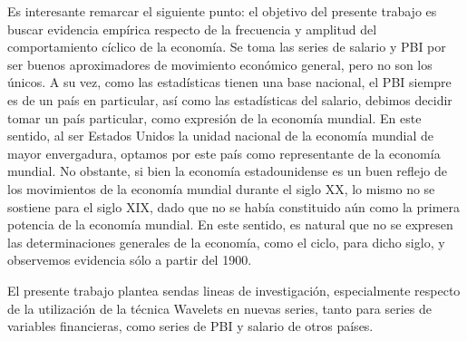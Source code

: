\documentclass[a4paper]{article}
\begin{document}
Es interesante remarcar el siguiente punto: el objetivo del presente trabajo es buscar evidencia empírica respecto de la frecuencia y amplitud del comportamiento cíclico de la economía. Se toma las series de salario y PBI por ser buenos aproximadores de movimiento económico general, pero no son los únicos. A su vez, como las estadísticas tienen una base nacional, el PBI siempre es de un país en particular, así como las estadísticas del salario, debimos decidir tomar un país particular, como expresión de la economía mundial. En este sentido, al ser Estados Unidos la unidad nacional de la economía mundial de mayor envergadura, optamos por este país como representante de la economía mundial. No obstante, si bien la economía estadounidense es un buen reflejo de los movimientos de la economía mundial durante el siglo XX, lo mismo no se sostiene para el siglo XIX, dado que no se había constituido aún como la primera potencia de la economía mundial. En este sentido, es natural que no se expresen las determinaciones generales de la economía, como el ciclo, para dicho siglo, y observemos evidencia sólo a partir del 1900.

El presente trabajo plantea sendas lineas de investigación, especialmente respecto de la utilización de la técnica Wavelets en nuevas series, tanto para series de variables financieras, como series de PBI y salario de otros países.

\renewcommand{\appendixname}{Anexos}
\renewcommand{\appendixtocname}{Anexos}
\renewcommand{\appendixpagename}{Anexos}

\appendix
\end{document}
